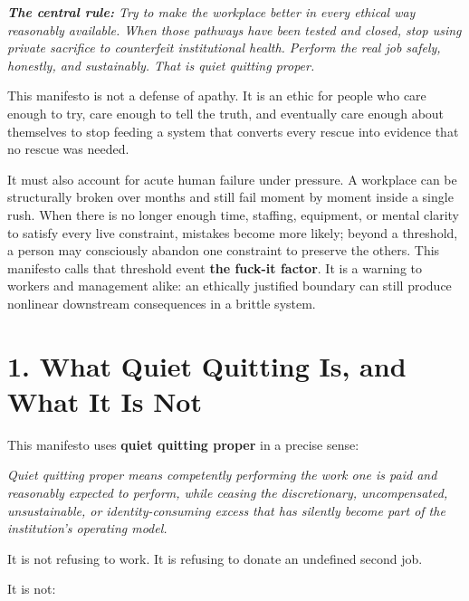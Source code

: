 \documentclass[11pt,oneside]{article}
\renewenvironment{quote}
  {\begin{tcolorbox}[
      enhanced,
      breakable,
      colback=ManifestLight,
      colframe=ManifestRule,
      boxrule=0pt,
      leftrule=3pt,
      arc=0pt,
      outer arc=0pt,
      left=10pt,right=10pt,top=8pt,bottom=8pt,
      before skip=0.8em,after skip=0.8em
    ]\itshape}
  {\end{tcolorbox}}
\begin{document}
\begin{quote}
\textbf{The central rule:} Try to make the workplace better in every
ethical way reasonably available. When those pathways have been tested
and closed, stop using private sacrifice to counterfeit institutional
health. Perform the real job safely, honestly, and sustainably. That is
quiet quitting proper.
\end{quote}

This manifesto is not a defense of apathy. It is an ethic for people who
care enough to try, care enough to tell the truth, and eventually care
enough about themselves to stop feeding a system that converts every
rescue into evidence that no rescue was needed.

It must also account for acute human failure under pressure. A workplace
can be structurally broken over months and still fail moment by moment
inside a single rush. When there is no longer enough time, staffing,
equipment, or mental clarity to satisfy every live constraint, mistakes
become more likely; beyond a threshold, a person may consciously abandon
one constraint to preserve the others. This manifesto calls that
threshold event \textbf{the fuck-it factor}. It is a warning to workers
and management alike: an ethically justified boundary can still produce
nonlinear downstream consequences in a brittle system.

\section{1. What Quiet Quitting Is, and What It Is
Not}\label{what-quiet-quitting-is-and-what-it-is-not}

This manifesto uses \textbf{quiet quitting proper} in a precise sense:

\begin{quote}
Quiet quitting proper means competently performing the work one is paid
and reasonably expected to perform, while ceasing the discretionary,
uncompensated, unsustainable, or identity-consuming excess that has
silently become part of the institution's operating model.
\end{quote}

It is not refusing to work. It is refusing to donate an undefined second
job.

It is not:
\end{document}
